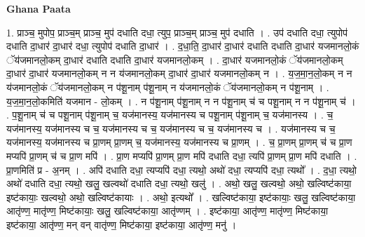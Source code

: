 \documentclass[17pt]{extarticle}
\begin{document}
\textbf{Ghana Paata } \newline

1. प्राञ्च॒ मुपोप॒ प्राञ्च॒म् प्राञ्च॒ मुप॑ दधाति दधा॒ त्युप॒ प्राञ्च॒म् प्राञ्च॒ मुप॑ दधाति । . उप॑ दधाति दधा॒ त्युपोप॑ दधाति दा॒धार॑ दा॒धार॑ दधा॒ त्युपोप॑ दधाति दा॒धार॑ । . द॒धा॒ति॒ दा॒धार॑ दा॒धार॑ दधाति दधाति दा॒धार॑ यजमानलो॒कं ॅय॑जमानलो॒कम् दा॒धार॑ दधाति दधाति दा॒धार॑ यजमानलो॒कम् । . दा॒धार॑ यजमानलो॒कं ॅय॑जमानलो॒कम् दा॒धार॑ दा॒धार॑ यजमानलो॒कम् न न य॑जमानलो॒कम् दा॒धार॑ दा॒धार॑ यजमानलो॒कम् न । . य॒ज॒मा॒न॒लो॒कम् न न य॑जमानलो॒कं ॅय॑जमानलो॒कम् न प॑शू॒नाम् प॑शू॒नाम् न य॑जमानलो॒कं ॅय॑जमानलो॒कम् न प॑शू॒नाम् । . य॒ज॒मा॒न॒लो॒कमिति॑ यजमान - लो॒कम् । . न प॑शू॒नाम् प॑शू॒नाम् न न प॑शू॒नाम् च॑ च पशू॒नाम् न न प॑शू॒नाम् च॑ । . प॒शू॒नाम् च॑ च पशू॒नाम् प॑शू॒नाम् च॒ यज॑मानस्य॒ यज॑मानस्य च पशू॒नाम् प॑शू॒नाम् च॒ यज॑मानस्य । . च॒ यज॑मानस्य॒ यज॑मानस्य च च॒ यज॑मानस्य च च॒ यज॑मानस्य च च॒ यज॑मानस्य च । . यज॑मानस्य च च॒ यज॑मानस्य॒ यज॑मानस्य च प्रा॒णम् प्रा॒णम् च॒ यज॑मानस्य॒ यज॑मानस्य च प्रा॒णम् । . च॒ प्रा॒णम् प्रा॒णम् च॑ च प्रा॒ण मप्यपि॑ प्रा॒णम् च॑ च प्रा॒ण मपि॑ । . प्रा॒ण मप्यपि॑ प्रा॒णम् प्रा॒ण मपि॑ दधाति दधा॒ त्यपि॑ प्रा॒णम् प्रा॒ण मपि॑ दधाति । . प्रा॒णमिति॑ प्र - अ॒नम् । . अपि॑ दधाति दधा॒ त्यप्यपि॑ दधा॒ त्यथो॒ अथो॑ दधा॒ त्यप्यपि॑ दधा॒ त्यथो᳚ । . द॒धा॒ त्यथो॒ अथो॑ दधाति दधा॒ त्यथो॒ खलु॒ खल्वथो॑ दधाति दधा॒ त्यथो॒ खलु॑ । . अथो॒ खलु॒ खल्वथो॒ अथो॒ खल्विष्ट॑काया॒ इष्ट॑कायाः॒ खल्वथो॒ अथो॒ खल्विष्ट॑कायाः । . अथो॒ इत्यथो᳚ । . खल्विष्ट॑काया॒ इष्ट॑कायाः॒ खलु॒ खल्विष्ट॑काया॒ आतृ॑ण्ण॒ मातृ॑ण्ण॒ मिष्ट॑कायाः॒ खलु॒ खल्विष्ट॑काया॒ आतृ॑ण्णम् । . इष्ट॑काया॒ आतृ॑ण्ण॒ मातृ॑ण्ण॒ मिष्ट॑काया॒ इष्ट॑काया॒ आतृ॑ण्ण॒ मन् वन् वातृ॑ण्ण॒ मिष्ट॑काया॒ इष्ट॑काया॒ आतृ॑ण्ण॒ मनु॑ । \newline
\end{document}
